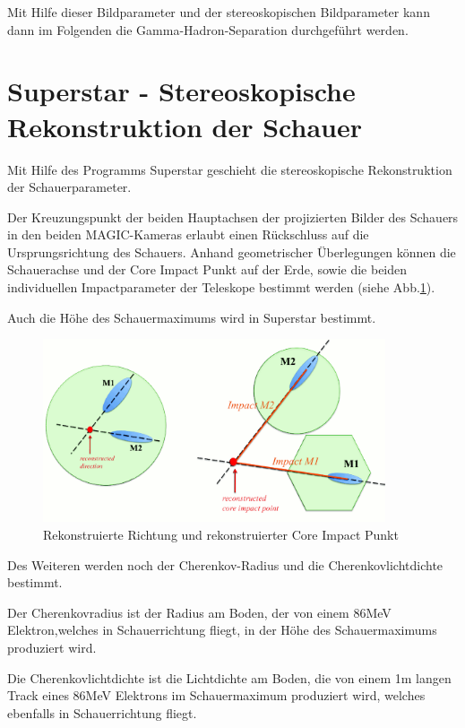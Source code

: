 Mit Hilfe dieser Bildparameter und der stereoskopischen Bildparameter kann dann im Folgenden die Gamma-Hadron-Separation durchgeführt werden.


\section{Superstar - Stereoskopische Rekonstruktion der Schauer}
Mit Hilfe des Programms Superstar geschieht die stereoskopische Rekonstruktion der Schauerparameter.

Der Kreuzungspunkt der beiden Hauptachsen der projizierten Bilder des Schauers in den beiden MAGIC-Kameras erlaubt einen Rückschluss auf die Ursprungsrichtung des Schauers.
Anhand geometrischer Überlegungen können die Schauerachse und der Core Impact Punkt auf der Erde, sowie die beiden individuellen Impactparameter der Teleskope bestimmt werden (siehe Abb.\ref{Superstar}).

Auch die Höhe des Schauermaximums wird in Superstar bestimmt.

\begin{figure}
    \centering
    \includegraphics[width=0.9\textwidth]{./Plots/03_MonteCarlos/Superstar.png}
    \caption{Rekonstruierte Richtung und rekonstruierter Core Impact Punkt \cite{Superstar}}
    \label{Superstar}
\end{figure}

Des Weiteren werden noch der Cherenkov-Radius und die Cherenkovlichtdichte bestimmt.

Der Cherenkovradius ist der Radius am Boden, der von einem 86MeV Elektron,welches in Schauerrichtung fliegt, in der Höhe des Schauermaximums produziert wird.

Die Cherenkovlichtdichte ist die Lichtdichte am Boden, die von einem 1m langen Track eines 86MeV Elektrons im Schauermaximum produziert wird, welches ebenfalls in Schauerrichtung fliegt.

